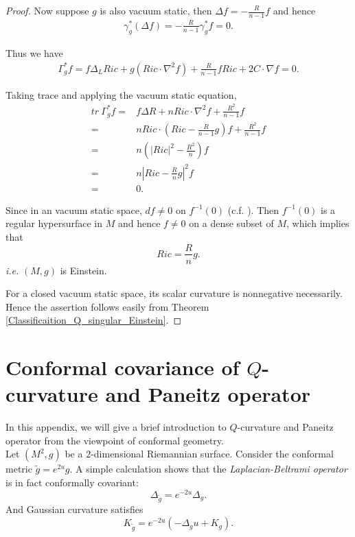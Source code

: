 \documentclass[12pt]{amsart}
\theoremstyle{definition}
\theoremstyle{remark}
\numberwithin{equation}{section}
\begin{document}
\begin{proof}
Now suppose $g$ is also vacuum static, then $\Delta f = -\frac{R}{n-1}f$ and hence
\begin{align*}
\gamma_g^* (\Delta f) = -\frac{R}{n-1} \gamma_g^* f = 0.
\end{align*}

Thus we have
\begin{align*}
\Gamma_g^* f
= f \Delta_L Ric + g (Ric \cdot \nabla^2 f)  + \frac{R}{n-1} f Ric + 2 C \cdot \nabla f = 0.
\end{align*}

Taking trace and applying the vacuum static equation,
\begin{align*}
tr\ \Gamma_g^* f
=& f \Delta R + n Ric \cdot \nabla^2 f + \frac{R^2}{n-1} f\\
=& n Ric \cdot \left( Ric - \frac{R}{n-1}g\right) f + \frac{R^2}{n-1} f\\
=& n \left( |Ric|^2 - \frac{R^2}{n} \right) f \\
=& n \left|Ric - \frac{R}{n} g\right|^2 f\\
=& 0.
\end{align*}

Since in an vacuum static space, $df \neq 0$ on $f^{-1}(0)$ (c.f. \cite{F-M}). Then $f^{-1}(0)$ is a regular hypersurface in $M$ and hence $f \neq 0$ on a dense subset of $M$, which implies that $$Ric = \frac{R}{n} g.$$ \emph{i.e.} $(M,g)$ is Einstein.

For a closed vacuum static space, its scalar curvature is nonnegative necessarily. Hence the assertion follows easily from Theorem \ref{Classificaition_Q_singular_Einstein}.

\end{proof}

\appendix
\section{Conformal covariance of $Q$-curvature and Paneitz operator}

In this appendix, we will give a brief introduction to $Q$-curvature and Paneitz operator from the viewpoint of conformal geometry. \\

Let $(M^2, g)$ be a $2$-dimensional Riemannian surface. Consider the conformal metric $\tilde{g} = e^{2u}g$. A simple calculation shows that the \emph{Laplacian-Beltrami operator} is in fact conformally covariant: 
\begin{equation}
\Delta_{\tilde{g}} = e^{-2u}\Delta_{g}.
\end{equation}
And Gaussian curvature satisfies 
\begin{equation}
K_{\tilde{g}} = e^{-2u}\left(-\Delta_{g}u + K_{g} \right).
\end{equation}\\
\end{document}
